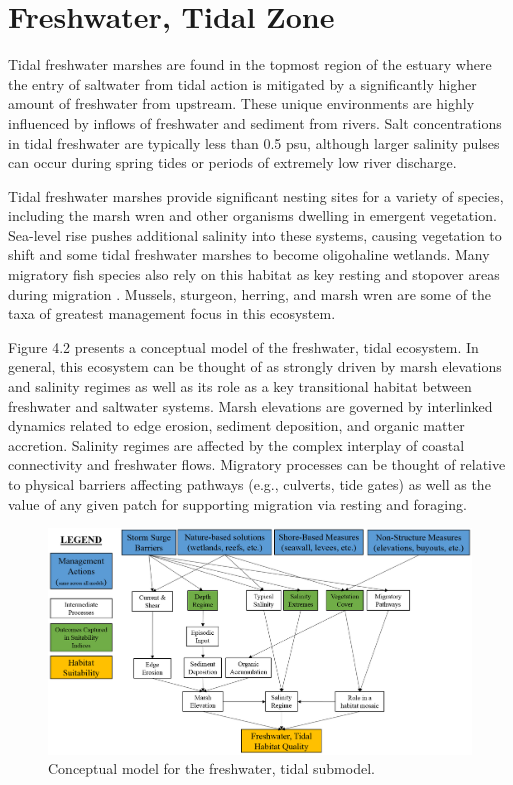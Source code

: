 \documentclass[
]{book}
\begin{document}
\hypertarget{freshwater-tidal-zone}{%
\section{Freshwater, Tidal Zone}\label{freshwater-tidal-zone}}

Tidal freshwater marshes are found in the topmost region of the estuary where the entry of saltwater from tidal action is mitigated by a significantly higher amount of freshwater from upstream. These unique environments are highly influenced by inflows of freshwater and sediment from rivers. Salt concentrations in tidal freshwater are typically less than 0.5 psu, although larger salinity pulses can occur during spring tides or periods of extremely low river discharge.

Tidal freshwater marshes provide significant nesting sites for a variety of species, including the marsh wren and other organisms dwelling in emergent vegetation. Sea-level rise pushes additional salinity into these systems, causing vegetation to shift and some tidal freshwater marshes to become oligohaline wetlands. Many migratory fish species also rely on this habitat as key resting and stopover areas during migration \citep{pasternack_biogeomorphology_2000}. Mussels, sturgeon, herring, and marsh wren are some of the taxa of greatest management focus in this ecosystem.

Figure 4.2 presents a conceptual model of the freshwater, tidal ecosystem. In general, this ecosystem can be thought of as strongly driven by marsh elevations and salinity regimes as well as its role as a key transitional habitat between freshwater and saltwater systems. Marsh elevations are governed by interlinked dynamics related to edge erosion, sediment deposition, and organic matter accretion. Salinity regimes are affected by the complex interplay of coastal connectivity and freshwater flows. Migratory processes can be thought of relative to physical barriers affecting pathways (e.g., culverts, tide gates) as well as the value of any given patch for supporting migration via resting and foraging.

\begin{figure}
\includegraphics[width=21.62in]{ZZ_Fig04.02_Fresh.Tid_ConModel} \caption{Conceptual model for the freshwater, tidal submodel.}\label{fig:unnamed-chunk-9}
\end{figure}
\end{document}
